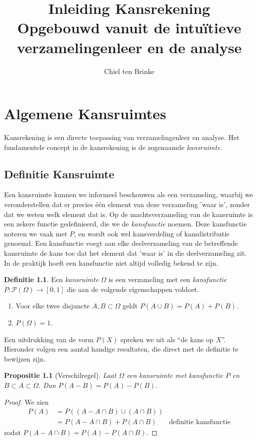 \documentclass[a4paper]{report}
\title{Inleiding Kansrekening \\ \small{Opgebouwd vanuit de intu\"itieve verzamelingenleer en de analyse}}
\author{Chiel ten Brinke}
\newtheorem{proposition}[theorem]{Propositie}
\theoremstyle{definition}
\newtheorem{definition}[theorem]{Definitie}
\begin{document}
\maketitle

\chapter{Algemene Kansruimtes}
Kansrekening is een directe toepassing van verzamelingenleer en analyse.
Het fundamentele concept in de kansrekening is de zogenaamde \emph{kansruimte}.

\section{Definitie Kansruimte}
Een kansruimte kunnen we informeel beschouwen als een verzameling, waarbij we veronderstellen dat er precies \'e\'en element van deze verzameling 'waar is', zonder dat we weten welk element dat is.
Op de machtsverzameling van de kansruimte is een zekere functie gedefinieerd, die we de \emph{kansfunctie} noemen.
Deze kansfunctie noteren we vaak met $P$, en wordt ook wel kansverdeling of kansdistributie genoemd.
Een kansfunctie voegt aan elke deelverzameling van de betreffende kansruimte de kans toe dat het element dat 'waar is' in die deelverzameling zit.
In de praktijk hoeft een kansfunctie niet altijd volledig bekend te zijn.

\begin{definition}
	Een \emph{kansruimte} $\Omega$ is een verzameling met een \emph{kansfunctie} $P: \mathcal P(\Omega) \to [0,1]$  die aan de volgende eigenschappen voldoet.
	\begin{enumerate}[i]
		\item Voor elke twee disjuncte $A,B \subset \Omega$ geldt $P(A \cup B) = P(A) + P(B)$.
		\item $P(\Omega) = 1$.
	\end{enumerate}
\end{definition}

Een uitdrukking van de vorm $P(X)$ spreken we uit als ``de kans op $X$''.
Hieronder volgen een aantal handige resultaten, die direct met de definitie te bewijzen zijn.

\begin{proposition}[Verschilregel]
	\label{verschilregel}
	Laat $\Omega$ een kansruimte met kansfunctie $P$ en $B \subset A \subset \Omega$.
	Dan $P(A - B) = P(A) - P(B)$.
\end{proposition}
\begin{proof}
	We zien
	\begin{align*}
		P(A) 	&= P( (A - A \cap B) \cup (A \cap B) ) \\ 
			&= P(A - A \cap B ) + P(A \cap B) & \text{definitie kansfunctie}
	\end{align*}
	zodat $P(A - A \cap B ) = P(A) - P(A \cap B) $.
\end{proof}
\end{document}
